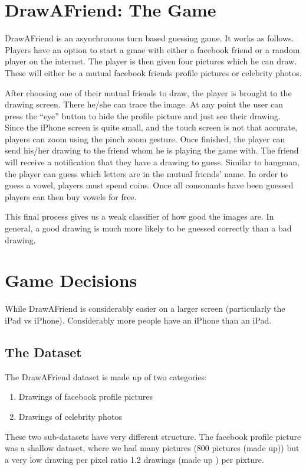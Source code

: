 \section{DrawAFriend: The Game}

DrawAFriend is an asynchronous turn based guessing game. It works as follows. Players have an option to start a gmae with either a facebook friend or a random player on the internet. The player is then given four pictures which he can draw. These will either be a mutual facebook friends profile pictures or celebrity photos.

After choosing one of their mutual friends to draw, the player is brought to the drawing screen. There he/she can trace the image. At any point the user can press the “eye” button to hide the profile picture and just see their drawing.  Since the iPhone screen is quite small, and the touch screen is not that accurate, players can zoom using the pinch zoom gesture. 
Once finished, the player can send his/her drawing to the friend whom he is playing the game with. The friend will receive a notification that they have a drawing to guess. Similar to hangman, the player can guess which letters are in the mutual friends’ name. In order to guess a vowel, players must spend coins. Once all consonants have been guessed players can then buy vowels for free. 

This final process gives us a weak classifier of how good the images are. In general, a good drawing is much more likely to be guessed correctly than a bad drawing.

\section{Game Decisions}
While DrawAFriend is considerably easier on a larger screen (particularly the iPad vs iPhone). Considerably more people have an iPhone than an iPad. 


\subsection{The Dataset}
The DrawAFriend dataset is made up of two categories:
\begin{enumerate}
\item Drawings of facebook profile pictures
\item Drawings of celebrity photos
\end{enumerate}

These two sub-datasets have very different structure. The facebook profile picture was a shallow dataset, where we had many pictures (800 pictures (made up)) but a very low drawing per pixel ratio 1.2 drawings (made up ) per pixture. 

